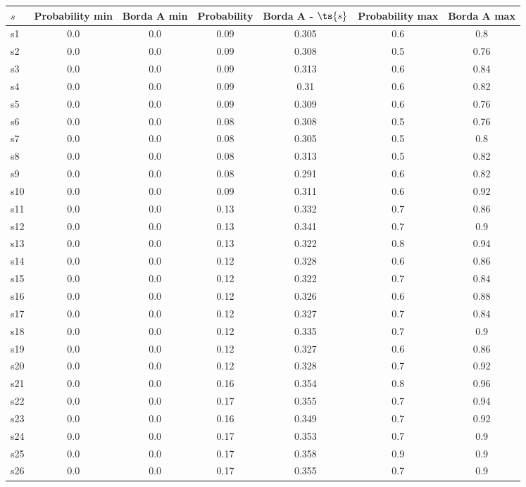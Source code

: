 \documentclass{article}
\begin{document}
\noindent\begin{tabular}{|l|c|c|c|c|c|c|}
\hline
$s$& Probability min & Borda A min & Probability & Borda A - $\ts{s}$ & Probability max & Borda A max\\
\hline
s1 &0.0 & 0.0 & 0.09 & 0.305 & 0.6 & 0.8\\
\hline
s2 &0.0 & 0.0 & 0.09 & 0.308 & 0.5 & 0.76\\
\hline
s3 &0.0 & 0.0 & 0.09 & 0.313 & 0.6 & 0.84\\
\hline
s4 &0.0 & 0.0 & 0.09 & 0.31 & 0.6 & 0.82\\
\hline
s5 &0.0 & 0.0 & 0.09 & 0.309 & 0.6 & 0.76\\
\hline
s6 &0.0 & 0.0 & 0.08 & 0.308 & 0.5 & 0.76\\
\hline
s7 &0.0 & 0.0 & 0.08 & 0.305 & 0.5 & 0.8\\
\hline
s8 &0.0 & 0.0 & 0.08 & 0.313 & 0.5 & 0.82\\
\hline
s9 &0.0 & 0.0 & 0.08 & 0.291 & 0.6 & 0.82\\
\hline
s10 &0.0 & 0.0 & 0.09 & 0.311 & 0.6 & 0.92\\
\hline
s11 &0.0 & 0.0 & 0.13 & 0.332 & 0.7 & 0.86\\
\hline
s12 &0.0 & 0.0 & 0.13 & 0.341 & 0.7 & 0.9\\
\hline
s13 &0.0 & 0.0 & 0.13 & 0.322 & 0.8 & 0.94\\
\hline
s14 &0.0 & 0.0 & 0.12 & 0.328 & 0.6 & 0.86\\
\hline
s15 &0.0 & 0.0 & 0.12 & 0.322 & 0.7 & 0.84\\
\hline
s16 &0.0 & 0.0 & 0.12 & 0.326 & 0.6 & 0.88\\
\hline
s17 &0.0 & 0.0 & 0.12 & 0.327 & 0.7 & 0.84\\
\hline
s18 &0.0 & 0.0 & 0.12 & 0.335 & 0.7 & 0.9\\
\hline
s19 &0.0 & 0.0 & 0.12 & 0.327 & 0.6 & 0.86\\
\hline
s20 &0.0 & 0.0 & 0.12 & 0.328 & 0.7 & 0.92\\
\hline
s21 &0.0 & 0.0 & 0.16 & 0.354 & 0.8 & 0.96\\
\hline
s22 &0.0 & 0.0 & 0.17 & 0.355 & 0.7 & 0.94\\
\hline
s23 &0.0 & 0.0 & 0.16 & 0.349 & 0.7 & 0.92\\
\hline
s24 &0.0 & 0.0 & 0.17 & 0.353 & 0.7 & 0.9\\
\hline
s25 &0.0 & 0.0 & 0.17 & 0.358 & 0.9 & 0.9\\
\hline
s26 &0.0 & 0.0 & 0.17 & 0.355 & 0.7 & 0.9\\

\end{tabular}
\end{document}
